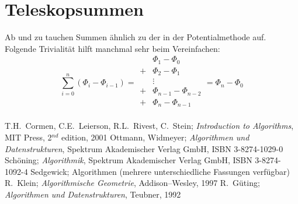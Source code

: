 \documentclass{scrreprt}%
\theoremstyle{break}
\begin{document}
\section{Teleskopsummen} \label{Teleskopsumme}
Ab und zu tauchen Summen ähnlich zu der in der Potentialmethode auf. Folgende Trivialität hilft manchmal sehr
beim Vereinfachen:
\[\sum_{i=0}^n ({\Phi}_i-{\Phi}_{i-1})=
\begin{array}{ll}
& {\Phi}_1-{\Phi}_0\\
+ & {\Phi}_2-{\Phi}_1\\
& \vdots \\
+ & {\Phi}_{n-1}-{\Phi}_{n-2}\\
+ & {\Phi}_n-{\Phi}_{n-1}\\
\end{array}
={\Phi}_n-{\Phi}_0\] 
\begin{thebibliography}{99}
\label{literaturverzeichnis}
T.H.~Cormen, C.E.~Leierson, R.L.~Rivest, C.~Stein; \textit{Introduction to Algorithms}, MIT Press, 2$^{nd}$ edition, 2001
Ottmann, Widmeyer; \textit{Algorithmen und Datenstrukturen}, Spektrum Akademischer Verlag GmbH, ISBN 3-8274-1029-0
Schöning; \textit{Algorithmik}, Spektrum Akademischer Verlag GmbH, ISBN 3-8274-1092-4
Sedgewick; Algorithmen (mehrere unterschiedliche Fassungen verfügbar)
R.~Klein; \textit{Algorithmische Geometrie}, Addison--Wesley, 1997
R.~Güting; \textit{Algorithmen und Datenstrukturen}, Teubner, 1992
\end{thebibliography}
\end{document}
